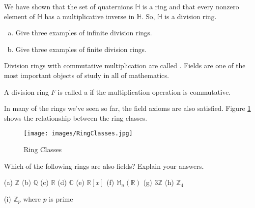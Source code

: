 We have shown that the set of quaternions ${\mathbb H}$ is a ring and that every nonzero element of ${\mathbb H}$ has a multiplicative inverse in ${\mathbb H}$.  So, ${\mathbb H}$ is a division ring.


\begin{exercise}
\begin{enumerate}[(a)]
\item
Give three examples of infinite division rings.
\item
Give three examples of finite division rings.
\end{enumerate}
\end{exercise}

Division rings with commutative multiplication are called .  Fields are one of the most important objects of study in all of mathematics.

\begin{defn} \label{def:field}
A division ring $F$ is called a  if the multiplication operation is commutative. \end{defn}

In many of the rings we've seen so far, the field axioms are also satisfied.  Figure \ref{fig:ring_classes} shows the relationship between the ring classes.

\begin{figure}[H]
\centerline {
\texttt{[image: images/RingClasses.jpg]} }
\caption{Ring Classes}\label{fig:ring_classes}
\end{figure}

\begin{exercise}\label{exercise:rings:poly47}
Which of the following rings are also fields?  Explain your answers.

(a) ${\mathbb Z}$\quad
(b) ${\mathbb Q}$\quad
(c) ${\mathbb R}$\quad
(d) ${\mathbb C}$\quad
(e) ${\mathbb R}[x]$\quad  
(f) ${\mathbb M}_n({\mathbb R})$\quad
(g) $3{\mathbb Z}$\quad
(h) ${\mathbb Z}_4$\quad

(i) ${\mathbb Z}_p$ where $p$ is prime
\end{exercise}

